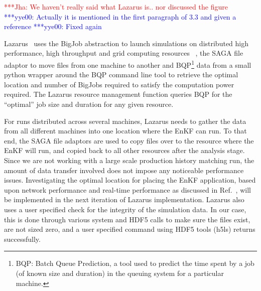 \documentclass{acm_proc_article-sp}
\newcommand{\jhanote}[1]{ {\textcolor{red} { ***Jha: #1 }}}
\newcommand{\yyenote}[1]{ {\textcolor{blue} { ***yye00: #1 }}}
\newcommand{\jhanote}[1]{}
\newcommand{\yyenote}[1]{}
\begin{document}


\jhanote{We haven't really said what Lazarus is.. nor discussed the
  figure}\yyenote{Actually it is mentioned in the first paragraph of 3.3 and given a reference}\yyenote{Fixed again}

Lazarus~\cite{gmac} uses the BigJob abstraction to launch simulations on
distributed high performance, high throughput and grid computing
resources ~\cite{gmac}, the SAGA file adaptor to move files from one
machine to another and BQP\footnote{BQP: Batch Queue Prediction, a tool
used to predict the time spent by a job (of known size and duration)
in the queuing system for a particular machine.} data from a small python wrapper around the
BQP command line tool to retrieve the optimal location and number of
BigJobs required to satisfy the computation power required. The Lazarus
resource management function queries BQP for the ``optimal'' job size
and duration for any given resource.

For runs distributed across several machines, Lazarus needs to gather
the data from all different machines into one location where the EnKF
can run. To that end, the SAGA file adaptors are used to copy files
over to the resource where the EnKF will run, and copied back to all
other resources after the analysis stage. Since we are not working
with a large scale production history matching run, the amount of data
transfer involved does not impose any noticeable performance
issues. Investigating the optimal location for placing the
EnKF application, based upon network performance and real-time
performance as discussed in Ref.~\cite{escience07}, will be implemented
in the next iteration of Lazarus implementation.  Lazarus also uses
a user specified check for the integrity of the simulation data. In
our case, this is done through various system and HDF5 calls to make
sure the files exist, are not sized zero, and a user specified command
using HDF5 tools (h5ls) returns successfully.
\end{document}
